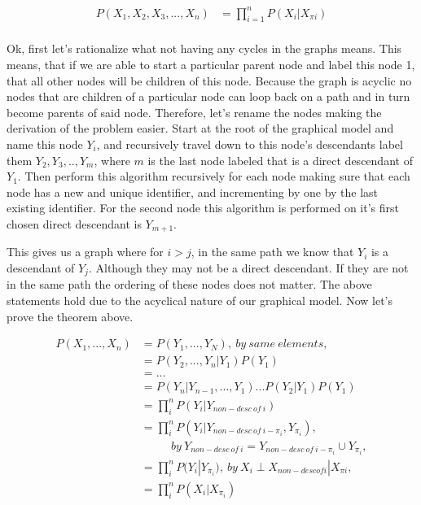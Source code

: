 \documentclass[paper=a4, fontsize=11pt]{scrartcl} %
\begin{document}
\begin{align}
P(X_1,X_2,X_3,...,X_n) &= \prod_{i=1}^n P(X_i|X_{\pi i}) \\
\end{align}

Ok, first let's rationalize what not having any cycles in the graphs means.  This means, that if we are able to start a particular parent node and label this node 1, that all other nodes will be children of this node.
Because the graph is acyclic no nodes that are children of a particular node can loop back on a path and in turn become parents of said node.  
Therefore, let's rename the nodes making the derivation of the problem easier.
Start at the root of the graphical model and name this node $Y_i$, and recursively travel down to this node's descendants label them $Y_2,Y_3,..,Y_m$, where $m$ is the last node labeled that is a direct descendant of $Y_1$.  
Then perform this algorithm recursively for each node making sure that each node has a new and unique identifier, and incrementing by one by the last existing identifier.
For the second node this algorithm is performed on it's first chosen direct descendant is $Y_{m+1}$.

This gives us a graph where for $i > j$, in the same path we know that $Y_i$ is a descendant of $Y_j$.  
Although they may not be a direct descendant.
If they are not in the same path the ordering of these nodes does not matter.
The above statements hold due to the acyclical nature of our graphical model.
Now let's prove the theorem above.

\begin{align}
P(X_1,...,X_n) &= P(Y_1,...,Y_N), \ by\ same \ elements, \\
&= P(Y_2,...,Y_n|Y_1)P(Y_1) \\
&=... \\
&= P(Y_n|Y_{n-1},...,Y_1)...P(Y_2|Y_1)P(Y_1) \\
&= \prod_i^n P(Y_i|Y_{non-desc\ of\ i}) \\
&= \prod_i^n P(Y_i|Y_{non-desc\ of\ i-\pi_i},Y_{\pi_i}), \\
&\ \ \ \ \ \ \ \ \ \ \ \ by \ Y_{non-desc\ of\ i} = Y_{non-desc\ of\ i-\pi_i} \cup Y_{\pi_i},  \\
&= \prod_i^n P(Y_i|Y_{\pi_i}), \ by\ X_i \perp X_{non-desc of i}|X_{\pi i}, \\
&= \prod_i^n P(X_i|X_{\pi_i}) \\
\end{align}


\end{document}
